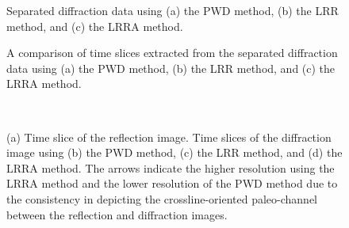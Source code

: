 \documentclass[10pt]{IEEEtran}
\begin{document}
\begin{figure}[htb!]
 \centering
\caption{Separated diffraction data using (a) the PWD method, (b) the LRR method, and (c) the LRRA method.}
\label{fig:b-pwd-n-0,b-lrr-n-0,b-lrra-n-0}
\end{figure}

\begin{figure}[htb!]
 \centering
\caption{A comparison of time slices extracted from the separated diffraction data using (a) the PWD method, (b) the LRR method, and (c) the LRRA method. }
\label{fig:b-pwd-n-t-0,b-lrr-n-t-0,b-lrra-n-t-0}
\end{figure}


\begin{figure}[htb!]
\centering
{}
 \\
\caption{(a) Time slice of the reflection image. Time slices of the diffraction image using (b) the PWD method, (c) the LRR method, and (d) the LRRA method. The arrows indicate the higher resolution using the LRRA method and the lower resolution of the PWD method due to the consistency in depicting the crossline-oriented paleo-channel between the reflection and diffraction images.}
\label{fig:b-pwd-rimag-0,b-pwd-imag-0,b-lrr-imag-0,b-lrra-imag-0}
\end{figure}



\end{document}
